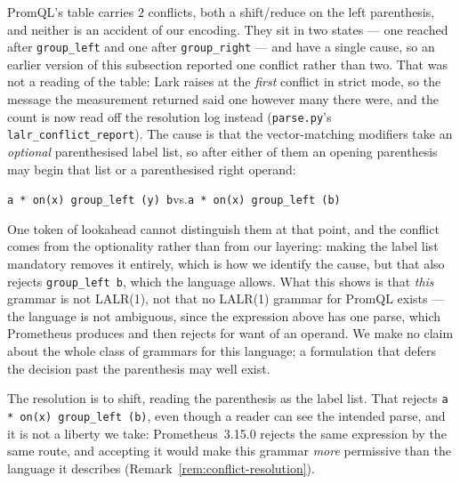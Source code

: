 \begin{remark}\label{rem:conflict-cause}
PromQL's table carries $2$ conflicts, both a shift/reduce on the left parenthesis, and
neither is an accident of our encoding. They sit in two states --- one reached after
\texttt{group\_left} and one after \texttt{group\_right} --- and have a single cause, so
an earlier version of this subsection reported one conflict rather than two. That was not
a reading of the table: Lark raises at the \emph{first} conflict in strict mode, so the
message the measurement returned said one however many there were, and the count is now
read off the resolution log instead (\texttt{parse.py}'s
\texttt{lalr\_conflict\_report}). The cause is that the vector-matching modifiers take an
\emph{optional} parenthesised label list, so after either of them an opening parenthesis
may begin that list or a parenthesised right operand:
\begin{center}\footnotesize
\texttt{a * on(x) group\_left (y) b}\qquad vs.\qquad\texttt{a * on(x) group\_left (b)}
\end{center}
One token of lookahead cannot distinguish them at that point, and the conflict comes
from the optionality rather than from our layering: making the label list mandatory
removes it entirely, which is how we identify the cause, but that also rejects
\texttt{group\_left b}, which the language allows. What this shows is that \emph{this}
grammar is not LALR(1), not that no LALR(1) grammar for PromQL exists --- the language
is not ambiguous, since the expression above has one parse, which Prometheus produces
and then rejects for want of an operand. We make no claim about the whole class of
grammars for this language; a formulation that defers the decision past the
parenthesis may well exist.

The resolution is to shift, reading the parenthesis as the label list. That rejects
\texttt{a * on(x) group\_left (b)}, even though a reader can see the intended parse, and
it is not a liberty we take: Prometheus~3.15.0 rejects the same expression by the same
route, and accepting it would make this grammar \emph{more} permissive than the language
it describes (Remark~\ref{rem:conflict-resolution}).
\end{remark}
